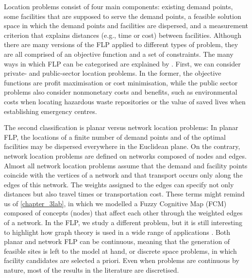 Location problems consist of four main components: existing demand points, some facilities that are supposed to serve the demand points, a feasible solution space in which the demand points and facilities are dispersed, and a measurement criterion that explains distances (e.g., time or cost) between facilities. Although there are many versions of the FLP applied to different types of problem, they are all comprised of an objective function and a set of constraints. The many ways in which FLP can be categorised are explained by \cite{wolf2022solving}. First, we can consider private- and public-sector location problems. In the former, the objective functions are profit maximisation or cost minimisation, while the public sector problems also consider nonmonetary costs and benefits, such as environmental costs when locating hazardous waste repositories or the value of saved lives when establishing emergency centres. 

The second classification is planar versus network location problems: In planar FLP, the locations of a finite number of demand points and of the optimal facilities may be dispersed everywhere in the Euclidean plane. On the contrary, network location problems are defined on networks composed of nodes and edges. Almost all network location problems assume that the demand and facility points coincide with the vertices of a network and that transport occurs only along the edges of this network. The weights assigned to the edges can specify not only distances but also travel times or transportation cost. These terms might remind us of \cref{chapter_3lab}, in which we modelled a Fuzzy Cognitive Map (FCM) composed of concepts (nodes) that affect each other through the weighted edges of a network. In the FLP, we study a different problem, but it is still interesting to highlight how graph theory is used in a wide range of applications \citep{papageorgiou2003fuzzy, seppanen1970facilities}. Both planar and network FLP can be continuous, meaning that the generation of feasible sites is left to the model at hand, or discrete space problems, in which facility candidates are selected a priori. Even when problems are continuous by nature, most of the results in the literature are discretised.

